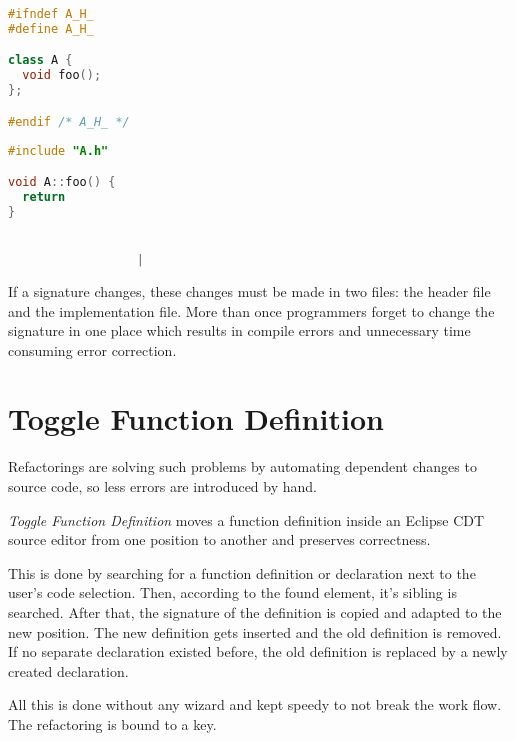 \vspace{0.5cm}
\begin{minipage}{.468\textwidth}
\lstset{xrightmargin=0.55cm}
\begin{lstlisting}[caption={Header file with a\newline declaration},
label={twofile1}, language=C++]
#ifndef A_H_
#define A_H_

class A {
  void foo();
};

#endif /* A_H_ */
\end{lstlisting}
\end{minipage}%
\begin{minipage}{.492\textwidth}
\lstset{xleftmargin=0.55cm}
\begin{lstlisting}[caption={Source file containing definition},
label={twofile2}, language=C++ ]
#include "A.h"

void A::foo() {
  return
}


	              |
\end{lstlisting}
\end{minipage}

If a signature changes, these changes must be made in two files: the header file
and the implementation file. More than once programmers forget to change the
signature in one place which results in compile errors and unnecessary time
consuming error correction.

\section*{Toggle Function Definition}

Refactorings are solving such problems by automating dependent changes to source
code, so less errors are introduced by hand.

\textit{Toggle Function Definition} moves a function definition inside an 
Eclipse CDT source editor from one position to another and preserves 
correctness.

This is done by searching for a function definition or declaration next to the
user's code selection. Then, according to the found
element, it's sibling is searched. After that, the signature of the definition is
copied and adapted to the new position. The new definition gets inserted and
the old definition is removed.
If no separate declaration existed before, the old definition is replaced by a 
newly created declaration.

All this is done without any wizard and kept speedy to not break the work flow.
The refactoring is bound to a key.

